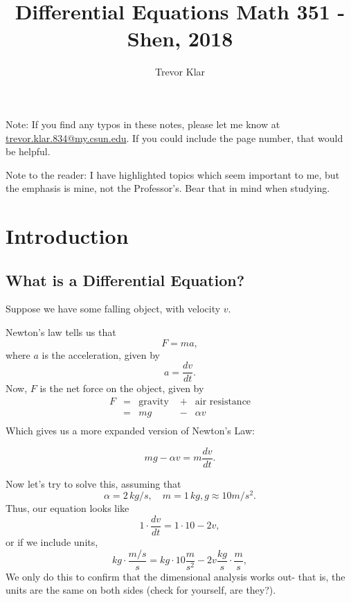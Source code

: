 \documentclass[a5paper]{article}
\title{Differential Equations Math 351 - Shen, 2018}
\author{Trevor Klar}
\theoremstyle{definition}%
\numberwithin{exercise}{section}
\theoremstyle{remark}%
\begin{document}
\maketitle

\tableofcontents



\begin{highlight}
Note: If you find any typos in these notes, please let me know at \\ \href{mailto:trevor.klar.834@my.csun.edu}{trevor.klar.834@my.csun.edu}. If you could include the page number, that would be helpful. 

Note to the reader: I have highlighted topics which seem important to me, but the emphasis is mine, not the Professor's. Bear that in mind when studying. 
\end{highlight}

\pagebreak
\section{Introduction}

\subsection{What is a Differential Equation?}

Suppose we have some falling object, with velocity $v$. 

\mbox{}

\noindent Newton's law tells us that $$F=ma,$$ where $a$ is the acceleration, given by $$ a=\frac{dv}{dt}.$$ Now, $F$ is the net force on the object, given by 
\[
\begin{array}{rclcl}
F&=&\text{gravity } &+& \text{air resistance}\\
&=&mg &-& \alpha v\\
\end{array}\]
Which gives us a more expanded version of Newton's Law:
\begin{highlight}
$$mg-\alpha v = m \frac{dv}{dt}.$$
\end{highlight}
Now let's try to solve this, assuming that 
$$\alpha=2 \,kg/s, \quad m=1 \,kg, g \approx 10 m/s^2.$$
Thus, our equation looks like 
$$1 \cdot \frac{dv}{dt} = 1 \cdot 10-2v,$$
or if we include units, 
$$kg \cdot \frac{m/s}{s} = kg \cdot 10 \frac{m}{s^2}-2v \frac{kg}{s}\cdot\frac{m}{s},$$
We only do this to confirm that the dimensional analysis works out- that is, the units are the same on both sides (check for yourself, are they?).
\end{document}
